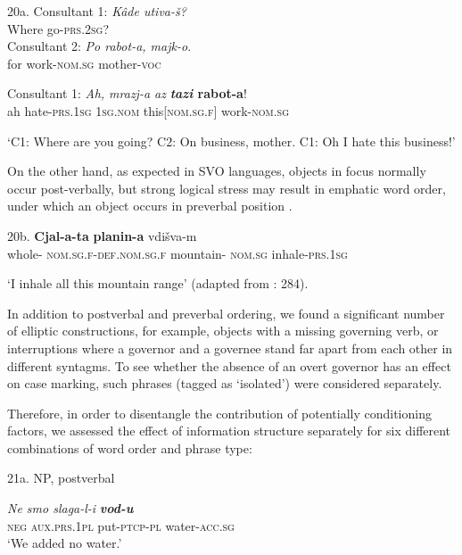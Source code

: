 \documentclass[output=paper]{langscibook}
\begin{document}
20a.  Consultant 1: \textit{Kâde     utiva-š?}\\
                                   Where  go-\textsc{prs.2sg}?\\
                                           

         Consultant 2: \textit{Po rabot-a,             majk-o}.\\
                                  for work-\textsc{nom.sg}   mother-\textsc{voc}

          Consultant 1: \textit{Ah, mrazj-a             az} \textbf{\textit{tazi}                    \textbf{rabot-a}}!\\
                                   ah   hate-\textsc{prs.1sg}   \textsc{1sg}.\textsc{nom}  this[\textsc{nom.sg.f}]  work-\textsc{nom.sg}

‘C1: Where are you going? C2: On business, mother. C1: Oh I hate this business!’

On the other hand, as expected in SVO languages, objects in focus normally occur post-verbally, but strong logical stress may result in emphatic word order, under which an object occurs in preverbal position . 

20b.  \textbf{Cjal-a-ta}                                        \textbf{planin-a}                      vdišva-m \\
  whole- \textsc{nom.sg.f-def.nom.sg.f}  mountain- \textsc{nom.sg}     inhale-\textsc{prs.1sg}

‘I inhale all this mountain range’ (adapted from \citealt{Georgieva1983}: 284). 

In addition to postverbal and preverbal ordering, we found a significant number of elliptic constructions, for example, objects with a missing governing verb, or interruptions where a governor and a governee stand far apart from each other in different syntagms. To see whether the absence of an overt governor has an effect on case marking, such phrases (tagged as ‘isolated’) were considered separately. 

Therefore, in order to disentangle the contribution of potentially conditioning factors, we assessed the effect of information structure separately for six different combinations of word order and phrase type: 

21a.     NP, postverbal

\textit{Ne     smo              slaga-l-i} \textbf{\textit{vod-u}}\\
\textsc{neg}    \textsc{aux.prs}.1\textsc{pl}  put-\textsc{ptcp-pl}    water-\textsc{acc.sg}\\
‘We added no water.’
\end{document}
